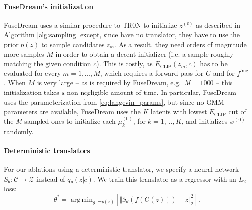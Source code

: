 \documentclass[nohyperref]{article}
\DeclareMathOperator*{\argmin}{arg\,min}
\theoremstyle{plain}
\theoremstyle{definition}
\theoremstyle{remark}
\begin{document}
\paragraph{FuseDream's initialization} FuseDream \citep{liu2021fusedream} uses a similar procedure to TR0N  to initialize $z^{(0)}$ as described in Algorithm \ref{alg:sampling} except, since \citet{liu2021fusedream} have no translator, they have to use the prior $p(z)$ to sample candidates $z_m$. As a result, they need orders of magnitude more samples $M$ in order to obtain a decent initializer (i.e. a sample roughly matching the given condition $c$). This is costly, as $E_\text{CLIP}(z_m, c)$ has to be evaluated for every $m=1,\dots,M$, which requires a forward pass for $G$ and for $f^{\text{img}}$. When $M$ is very large -- as is required by FuseDream, e.g.\ $M=1000$ -- this initialization takes a non-negligible amount of time. In particular, FuseDream uses the parameterization from \eqref{eq:langevin_params}, but since no GMM parameters are available, FuseDream uses the $K$ latents with lowest $E_\text{CLIP}$ out of the $M$ sampled ones to initialize each $\mu_k^{(0)}$, for $k=1,\dots, K$, and initializes $w^{(0)}$ randomly.

\paragraph{Deterministic translators} For our ablations using a deterministic translator, we specify a neural network $S_\theta: \mathcal{C} \rightarrow \mathcal{Z}$ instead of $q_\theta(z|c)$. We train this translator as a regressor with an $L_2$ loss:
\begin{equation}\label{app_eq:l2}
    \theta^* = \argmin_\theta \mathbb{E}_{p(z)}\left[\Vert S_\theta(f(G(z))) - z\Vert_2^2\right].
\end{equation}
\end{document}
